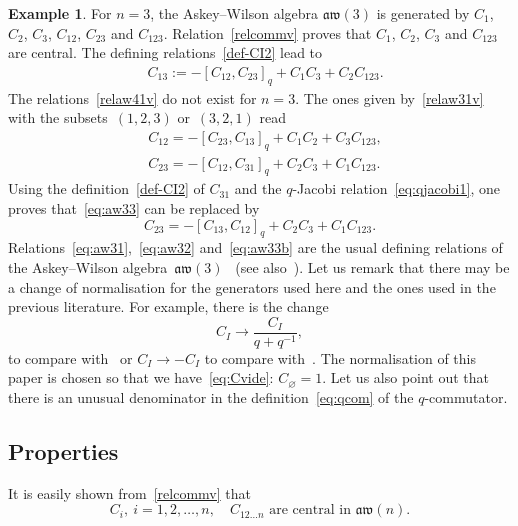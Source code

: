 \documentclass[10pt,a4paper]{amsart}
\numberwithin{equation}{section}
\theoremstyle{definition}
\newtheorem{exam}[theo]{Example}
\newcommand{\aw}{\mathfrak{aw}(n)}
\begin{document}
\begin{exam}\label{ex:aw3}
For $n=3$, the Askey--Wilson algebra $\mathfrak{aw}(3)$ is generated by $C_1$, $C_2$, $C_3$, $C_{12}$, $C_{23}$ and $C_{123}$.
Relation~\eqref{relcommv} proves that $C_1$, $C_2$, $C_3$ and $C_{123}$ are central. The defining relations~\eqref{def-CI2} lead to
\begin{align}\label{eq:aw31}
&C_{13} := -[C_{12},C_{23}]_q+ C_{1}C_{3}+C_{2}C_{123} .
\end{align}
The relations~\eqref{relaw41v} do not exist for $n=3$. The ones given by~\eqref{relaw31v} with the subsets~$(1,2,3)$ or~$(3,2,1)$ read
\begin{align}
&C_{12} = -[C_{23},C_{13}]_q+C_{1}C_{2}+C_{3}C_{123} ,\label{eq:aw32}
\\
&C_{23} = -[C_{12},C_{31}]_q+ C_{2}C_{3}+C_{1}C_{123} .\label{eq:aw33}
\end{align}
Using the definition~\eqref{def-CI2} of $C_{31}$ and the $q$-Jacobi relation~\eqref{eq:qjacobi1}, one proves that~\eqref{eq:aw33} can be replaced by
\begin{equation}
 C_{23} = -[C_{13},C_{12}]_q+ C_{2}C_{3}+C_{1}C_{123} .\label{eq:aw33b}
\end{equation}
Relations~\eqref{eq:aw31},~\eqref{eq:aw32} and~\eqref{eq:aw33b} are the usual defining relations of the Askey--Wilson algebra~$\mathfrak{aw}(3)$~\cite{Zh} (see also~\cite{avatar}).
Let us remark that there may be a change of normalisation for the generators used here and the ones used in the previous literature.
For example, there is the change
\[
C_I \to \frac{C_I}{q+q^{-1}},
\]
to compare with~\cite{avatar, DeC} or $C_I \to -C_I$ to compare with~\cite{PostWalt}.
The normalisation of this paper is chosen so that we have~\eqref{eq:Cvide}: $C_{\varnothing}=1$. Let us also point out that there is an unusual denominator in the definition~\eqref{eq:qcom} of the $q$-commutator.
\end{exam}


\subsection{Properties}%

It is easily shown from~\eqref{relcommv} that
\begin{equation*}
 C_i, \ i=1,2,\dots,n, \quad C_{12\dots n} \text{ are central in } \aw.
\end{equation*}
\end{document}
